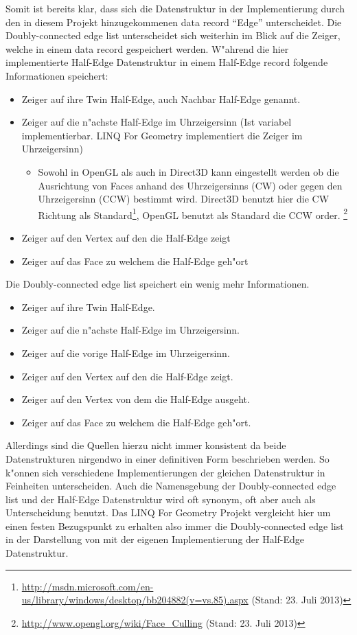 \documentclass[pagesize, paper=a4, fontsize=12pt,titlepage=true, headings=small, headnosepline, abstractoff, liststotoc, nochapterprefix, plainheadsepline]{scrreprt}
\newcommand{\LFGS}{LINQ For Geometry }
\newcommand{\HES}{Half-Edge Datenstruktur }
\begin{document}
Somit ist bereits klar, dass sich die Datenstruktur in der Implementierung durch den in diesem Projekt hinzugekommenen data record "`Edge"' unterscheidet. Die Doubly-connected edge list unterscheidet sich weiterhin im Blick auf die Zeiger, welche in einem data record gespeichert werden. W"ahrend die hier implementierte \HES in einem Half-Edge record folgende Informationen speichert:
\begin{itemize}
\item Zeiger auf ihre Twin Half-Edge, auch Nachbar Half-Edge genannt.
\item Zeiger auf die n"achste Half-Edge im Uhrzeigersinn (Ist variabel implementierbar. \LFGS implementiert die Zeiger im Uhrzeigersinn)
\begin{itemize}
\item Sowohl in OpenGL als auch in Direct3D kann eingestellt werden ob die Ausrichtung von Faces anhand des Uhrzeigersinns (CW) oder gegen den Uhrzeigersinn (CCW) bestimmt wird. Direct3D benutzt hier die CW Richtung als Standard\footnote{\url{http://msdn.microsoft.com/en-us/library/windows/desktop/bb204882(v=vs.85).aspx} (Stand: 23. Juli 2013)}, OpenGL benutzt als Standard die CCW order. \footnote{\url{http://www.opengl.org/wiki/Face_Culling} (Stand: 23. Juli 2013)}
\end{itemize}
\item Zeiger auf den Vertex auf den die Half-Edge zeigt
\item Zeiger auf das Face zu welchem die Half-Edge geh"ort
\end{itemize}

Die Doubly-connected edge list speichert ein wenig mehr Informationen.
\begin{itemize}
\item Zeiger auf ihre Twin Half-Edge.
\item Zeiger auf die n"achste Half-Edge im Uhrzeigersinn.
\item Zeiger auf die vorige Half-Edge im Uhrzeigersinn.
\item Zeiger auf den Vertex auf den die Half-Edge zeigt.
\item Zeiger auf den Vertex von dem die Half-Edge ausgeht.
\item Zeiger auf das Face zu welchem die Half-Edge geh"ort.
\end{itemize}

Allerdings sind die Quellen hierzu nicht immer konsistent da beide Datenstrukturen nirgendwo in einer definitiven Form beschrieben werden. So k"onnen sich verschiedene Implementierungen der gleichen Datenstruktur in Feinheiten unterscheiden. Auch die Namensgebung der Doubly-connected edge list und der \HES wird oft synonym, oft aber auch als Unterscheidung benutzt. Das \LFGS Projekt vergleicht hier um einen festen Bezugspunkt zu erhalten also immer die Doubly-connected edge list in der Darstellung von \cite[S.~30 und Folgende]{vanMarkdeBerg.2008} mit der eigenen Implementierung der Half-Edge Datenstruktur.
\end{document}
